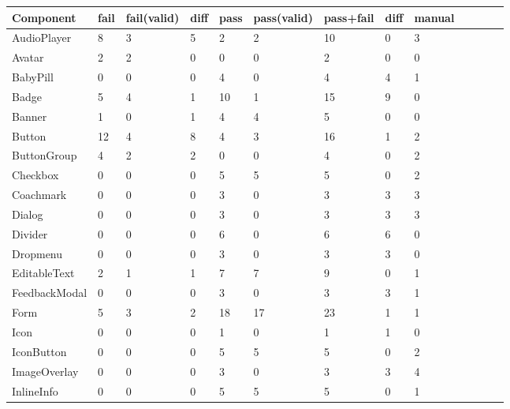 \documentclass{master_thesis}
\begin{document}

\begin{table}[!ht]
    \centering
    \begin{tabular}{|l|l|l|l|l|l|l|l|l|l|l|l|l|}
    \hline
        Component & fail & fail(valid) & diff & pass & pass(valid) & pass+fail & diff & manual  \\ \hline
        AudioPlayer & 8 & 3 & 5 & 2 & 2 & 10 & 0 & 3  \\ \hline
        Avatar & 2 & 2 & 0 & 0 & 0 & 2 & 0 & 0  \\ \hline
        BabyPill & 0 & 0 & 0 & 4 & 0 & 4 & 4 & 1  \\ \hline
        Badge & 5 & 4 & 1 & 10 & 1 & 15 & 9 & 0  \\ \hline
        Banner & 1 & 0 & 1 & 4 & 4 & 5 & 0 & 0  \\ \hline
        Button & 12 & 4 & 8 & 4 & 3 & 16 & 1 & 2  \\ \hline
        ButtonGroup & 4 & 2 & 2 & 0 & 0 & 4 & 0 & 2  \\ \hline
        Checkbox & 0 & 0 & 0 & 5 & 5 & 5 & 0 & 2  \\ \hline
        Coachmark & 0 & 0 & 0 & 3 & 0 & 3 & 3 & 3  \\ \hline
        Dialog & 0 & 0 & 0 & 3 & 0 & 3 & 3 & 3  \\ \hline
        Divider & 0 & 0 & 0 & 6 & 0 & 6 & 6 & 0  \\ \hline
        Dropmenu & 0 & 0 & 0 & 3 & 0 & 3 & 3 & 0  \\ \hline
        EditableText & 2 & 1 & 1 & 7 & 7 & 9 & 0 & 1  \\ \hline
        FeedbackModal & 0 & 0 & 0 & 3 & 0 & 3 & 3 & 1  \\ \hline
        Form & 5 & 3 & 2 & 18 & 17 & 23 & 1 & 1  \\ \hline
        Icon & 0 & 0 & 0 & 1 & 0 & 1 & 1 & 0  \\ \hline
        IconButton & 0 & 0 & 0 & 5 & 5 & 5 & 0 & 2  \\ \hline
        ImageOverlay & 0 & 0 & 0 & 3 & 0 & 3 & 3 & 4  \\ \hline
        InlineInfo & 0 & 0 & 0 & 5 & 5 & 5 & 0 & 1  \\ \hline
    \end{tabular}
\end{table}
\end{document}
